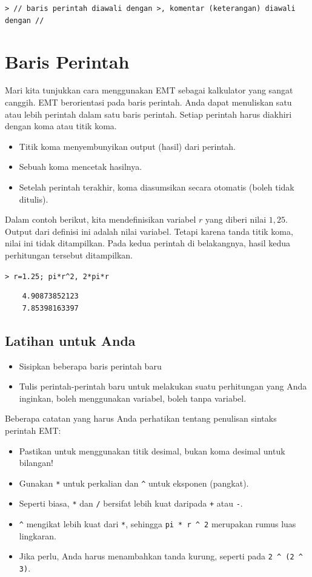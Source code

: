 \documentclass[11pt, a4paper]{article}
\newcommand{\emtcmd}[1]{\noindent\texttt{\textcolor{emtcommand}{>}\ #1}\par\smallskip}
\begin{document}
\emtcmd{\textcolor{emtcomment}{// baris perintah diawali dengan >, komentar (keterangan) diawali dengan //}}

\section*{Baris Perintah}

Mari kita tunjukkan cara menggunakan EMT sebagai kalkulator yang sangat canggih. EMT berorientasi pada baris perintah. Anda dapat menuliskan satu atau lebih perintah dalam satu baris perintah. Setiap perintah harus diakhiri dengan koma atau titik koma.

\begin{itemize}
    \item Titik koma menyembunyikan output (hasil) dari perintah.
    \item Sebuah koma mencetak hasilnya.
    \item Setelah perintah terakhir, koma diasumsikan secara otomatis (boleh tidak ditulis).
\end{itemize}

Dalam contoh berikut, kita mendefinisikan variabel $r$ yang diberi nilai $1,25$. Output dari definisi ini adalah nilai variabel. Tetapi karena tanda titik koma, nilai ini tidak ditampilkan. Pada kedua perintah di belakangnya, hasil kedua perhitungan tersebut ditampilkan.

\emtcmd{r=1.25; pi*r\^{}2, 2*pi*r}
\begin{verbatim}
    4.90873852123
    7.85398163397
\end{verbatim}

\subsection*{Latihan untuk Anda}

\begin{itemize}
    \item Sisipkan beberapa baris perintah baru
    \item Tulis perintah-perintah baru untuk melakukan suatu perhitungan yang Anda inginkan, boleh menggunakan variabel, boleh tanpa variabel.
\end{itemize}

\noindent\hrulefill

\medskip
Beberapa catatan yang harus Anda perhatikan tentang penulisan sintaks perintah EMT:
\begin{itemize}
    \item Pastikan untuk menggunakan titik desimal, bukan koma desimal untuk bilangan!
    \item Gunakan \texttt{*} untuk perkalian dan \texttt{\^{}} untuk eksponen (pangkat).
    \item Seperti biasa, \texttt{*} dan \texttt{/} bersifat lebih kuat daripada \texttt{+} atau \texttt{-}.
    \item \texttt{\^{}} mengikat lebih kuat dari \texttt{*}, sehingga \texttt{pi * r \^{} 2} merupakan rumus luas lingkaran.
    \item Jika perlu, Anda harus menambahkan tanda kurung, seperti pada \texttt{2 \^{} (2 \^{} 3)}.
\end{itemize}
\end{document}
